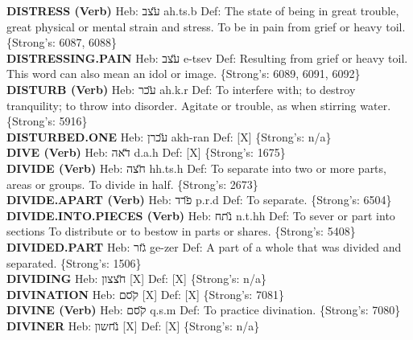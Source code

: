 {\textbf{DISTRESS (Verb)} Heb: {\large\H עצב} ah.ts.b Def: The state of being in great trouble, great physical or mental strain and stress. To be in pain from grief or heavy toil. \{Strong's: 6087, 6088\}\hfill{}\\

\textbf{DISTRESSING.PAIN} Heb: {\large\H עצב} e-tsev Def: Resulting from grief or heavy toil. This word can also mean an idol or image. \{Strong's: 6089, 6091, 6092\}\hfill{}\\

\textbf{DISTURB (Verb)} Heb: {\large\H עכר} ah.k.r Def: To interfere with; to destroy tranquility; to throw into disorder. Agitate or trouble, as when stirring water. \{Strong's: 5916\}\hfill{}\\

\textbf{DISTURBED.ONE} Heb: {\large\H עכרן} akh-ran Def: {[}X{]} \{Strong's: n/a\}\hfill{}\\

\textbf{DIVE (Verb)} Heb: {\large\H דאה} d.a.h Def: {[}X{]} \{Strong's: 1675\}\hfill{}\\

\textbf{DIVIDE (Verb)} Heb: {\large\H חצה} hh.ts.h Def: To separate into two or more parts, areas or groups. To divide in half. \{Strong's: 2673\}\hfill{}\\

\textbf{DIVIDE.APART (Verb)} Heb: {\large\H פרד} p.r.d Def: To separate. \{Strong's: 6504\}\hfill{}\\

\textbf{DIVIDE.INTO.PIECES (Verb)} Heb: {\large\H נתח} n.t.hh Def: To sever or part into sections To distribute or to bestow in parts or shares. \{Strong's: 5408\}\hfill{}\\

\textbf{DIVIDED.PART} Heb: {\large\H גזר} ge-zer Def: A part of a whole that was divided and separated. \{Strong's: 1506\}\hfill{}\\

\textbf{DIVIDING} Heb: {\large\H חצצון} {[}X{]} Def: {[}X{]} \{Strong's: n/a\}\hfill{}\\

\textbf{DIVINATION} Heb: {\large\H קסם} {[}X{]} Def: {[}X{]} \{Strong's: 7081\}\hfill{}\\

\textbf{DIVINE (Verb)} Heb: {\large\H קסם} q.s.m Def: To practice divination. \{Strong's: 7080\}\hfill{}\\

\textbf{DIVINER} Heb: {\large\H נחשון} {[}X{]} Def: {[}X{]} \{Strong's: n/a\}\hfill{}\\

}
